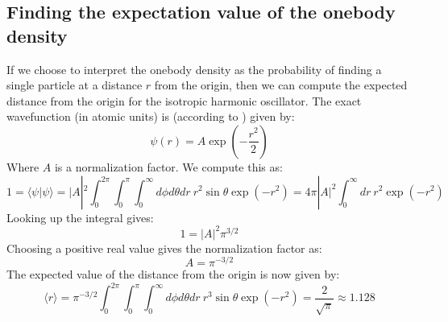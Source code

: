 \documentclass[a4paper, 10pt]{article}
\begin{document}
\begin{appendices}
		\section{Finding the expectation value of the onebody density}\label{ap:Expectation_value_onebody}
		If we choose to interpret the onebody density as the probability of finding a single particle at a distance $r$ from the origin, then we can compute the expected distance from the origin for the isotropic harmonic oscillator. The exact wavefunction (in atomic units) is (according to \cite{Griffiths2004}) given by:
		\begin{equation}
		\psi(r)=A\exp\left(-\frac{r^2}{2}\right)
		\end{equation}
		Where $A$ is a normalization factor. We compute this as:
		\begin{equation}
		1=\langle \psi | \psi \rangle = |A|^2 \int_0^{2\pi}\int_0^{\pi} \int_0^{\infty} d\phi d\theta dr\ r^2 \sin \theta \exp \left(-r^2\right) = 4\pi |A|^2\int_0^{\infty}dr\ r^2\exp(-r^2)
		\end{equation}
		Looking up the integral gives:
		\begin{equation}
		1= |A|^2 \pi^{3/2}
		\end{equation}
		Choosing a positive real value gives the normalization factor as:
		\begin{equation}
		A=\pi^{-3/2}
		\end{equation}
		The expected value of the distance from the origin is now given by:
		\begin{equation}
		\langle r \rangle =\pi^{-3/2}\int_0^{2\pi}\int_0^{\pi} \int_0^{\infty}d\phi d\theta dr\ r^3\sin \theta \exp (-r^2)=\frac{2}{\sqrt{\pi}}\approx 1.128
		\end{equation}
	\end{appendices}
\end{document}
